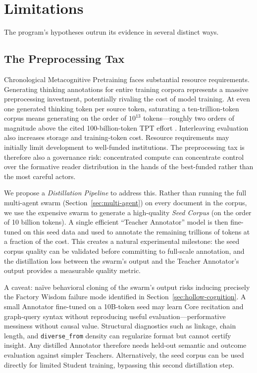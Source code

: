 \section{Limitations}\label{sec:limitations}

The program's hypotheses outrun its evidence in several distinct ways.

\subsection{The Preprocessing Tax}

Chronological Metacognitive Pretraining faces substantial resource requirements.
Generating thinking annotations for entire training corpora represents a massive
preprocessing investment, potentially rivaling the cost of model training. At
even one generated thinking token per source token, saturating a
ten-trillion-token corpus means generating on the order of $10^{13}$
tokens---roughly two orders of magnitude above the cited 100-billion-token TPT
effort \cite{nvidia2025tpt}. Interleaving evaluation also increases storage and
training-token cost. Resource requirements may initially limit development to
well-funded institutions. The preprocessing tax is therefore also a governance
risk: concentrated compute can concentrate control over the formative reader
distribution in the hands of the best-funded rather than the most careful
actors.

We propose a \emph{Distillation Pipeline} to address this. Rather than running the full multi-agent swarm (Section~\ref{sec:multi-agent}) on every document in the corpus, we use the expensive swarm to generate a high-quality \emph{Seed Corpus} (on the order of 10 billion tokens). A single efficient ``Teacher Annotator'' model is then fine-tuned on this seed data and used to annotate the remaining trillions of tokens at a fraction of the cost. This creates a natural experimental milestone: the seed corpus quality can be validated before committing to full-scale annotation, and the distillation loss between the swarm's output and the Teacher Annotator's output provides a measurable quality metric.

A caveat: na\"ive behavioral cloning of the swarm's output risks inducing precisely the Factory Wisdom failure mode identified in Section~\ref{sec:hollow-cognition}. A small Annotator fine-tuned on a 10B-token seed may learn Core recitation and graph-query syntax without reproducing useful evaluation---performative messiness without causal value. Structural diagnostics such as linkage, chain length, and \texttt{diverse\_from} density can regularize format but cannot certify insight. Any distilled Annotator therefore needs held-out semantic and outcome evaluation against simpler Teachers. Alternatively, the seed corpus can be used directly for limited Student training, bypassing this second distillation step.

